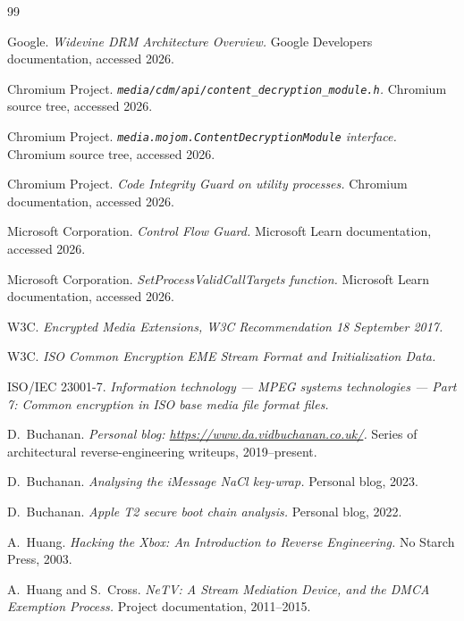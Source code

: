 \documentclass[11pt,letterpaper]{article}
\begin{document}

\begin{thebibliography}{99}

Google.
\textit{Widevine DRM Architecture Overview.}
Google Developers documentation, accessed 2026.

Chromium Project.
\textit{\texttt{media/cdm/api/content\_decryption\_module.h}.}
Chromium source tree, accessed 2026.

Chromium Project.
\textit{\texttt{media.mojom.ContentDecryptionModule} interface.}
Chromium source tree, accessed 2026.

Chromium Project.
\textit{Code Integrity Guard on utility processes.}
Chromium documentation, accessed 2026.

Microsoft Corporation.
\textit{Control Flow Guard.}
Microsoft Learn documentation, accessed 2026.

Microsoft Corporation.
\textit{SetProcessValidCallTargets function.}
Microsoft Learn documentation, accessed 2026.

W3C.
\textit{Encrypted Media Extensions, W3C Recommendation 18 September 2017.}

W3C.
\textit{ISO Common Encryption EME Stream Format and Initialization Data.}

ISO/IEC 23001-7.
\textit{Information technology — MPEG systems technologies — Part 7: Common encryption in ISO base media file format files.}

D.~Buchanan.
\textit{Personal blog: \url{https://www.da.vidbuchanan.co.uk/}.}
Series of architectural reverse-engineering writeups, 2019--present.

D.~Buchanan.
\textit{Analysing the iMessage NaCl key-wrap.}
Personal blog, 2023.

D.~Buchanan.
\textit{Apple T2 secure boot chain analysis.}
Personal blog, 2022.

A.~Huang.
\textit{Hacking the Xbox: An Introduction to Reverse Engineering.}
No Starch Press, 2003.

A.~Huang and S.~Cross.
\textit{NeTV: A Stream Mediation Device, and the DMCA Exemption Process.}
Project documentation, 2011--2015.


\end{thebibliography}
\end{document}
